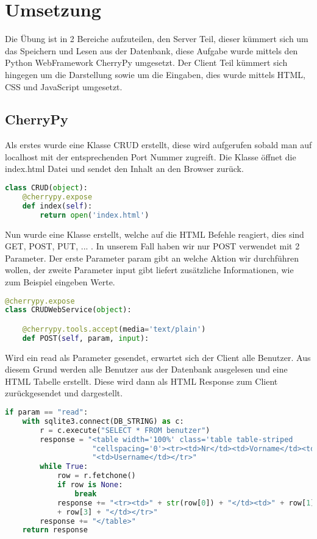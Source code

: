 
\section{Umsetzung}
\label{sec:Ergebnisse}

Die Übung ist in 2 Bereiche aufzuteilen, den Server Teil, dieser kümmert sich um das Speichern und Lesen aus der Datenbank, diese Aufgabe wurde mittels den Python WebFramework CherryPy umgesetzt. Der Client Teil kümmert sich hingegen um die Darstellung sowie um die Eingaben, dies wurde mittels HTML, CSS und JavaScript umgesetzt.

\subsection{CherryPy}

Als erstes wurde eine Klasse CRUD erstellt, diese wird aufgerufen sobald man auf localhost mit der entsprechenden Port Nummer zugreift. Die Klasse öffnet die index.html Datei und sendet den Inhalt an den Browser zurück.

\begin{lstlisting}[language=Python, caption=Klasse zur Darstellung der Index.html]
class CRUD(object):
	@cherrypy.expose
	def index(self):
		return open('index.html')
\end{lstlisting}

Nun wurde eine Klasse erstellt, welche auf die HTML Befehle reagiert, dies sind GET, POST, PUT, ... . In unserem Fall haben wir nur POST verwendet mit 2 Parameter. Der erste Parameter param gibt an welche Aktion wir durchführen wollen, der zweite Parameter input gibt liefert zusätzliche Informationen, wie zum Beispiel eingeben Werte.

\begin{lstlisting}[language=Python, caption=Klasse zur verwaltung der HTML Befehle]
@cherrypy.expose
class CRUDWebService(object):

	@cherrypy.tools.accept(media='text/plain')
	def POST(self, param, input):
\end{lstlisting}

Wird ein read als Parameter gesendet, erwartet sich der Client alle Benutzer. Aus diesem Grund werden alle Benutzer aus der Datenbank ausgelesen und eine HTML Tabelle erstellt. Diese wird dann als HTML Response zum Client zurückgesendet und dargestellt.

\begin{lstlisting}[language=Python, caption=Auslesen aller Benutzer aus der Datenbank]
if param == "read":
	with sqlite3.connect(DB_STRING) as c:
		r = c.execute("SELECT * FROM benutzer")
		response = "<table width='100%' class='table table-striped 		table-bordered'" \
					"cellspacing='0'><tr><td>Nr</td><td>Vorname</td><td>Nachname</td>" \
					"<td>Username</td></tr>"
		while True:
			row = r.fetchone()
			if row is None:
				break
			response += "<tr><td>" + str(row[0]) + "</td><td>" + row[1] + "</td><td>" + row[2] + "</td><td>" \
			+ row[3] + "</td></tr>"
		response += "</table>"
	return response
\end{lstlisting}


